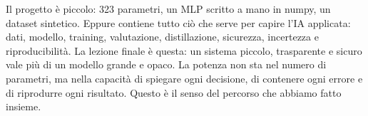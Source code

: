\medskip

Il progetto \progetto{} è piccolo: 323 parametri, un MLP scritto a mano in
numpy, un dataset sintetico. Eppure contiene tutto ciò che serve per capire
l'IA applicata: dati, modello, training, valutazione, distillazione,
sicurezza, incertezza e riproducibilità. La lezione finale è questa: un
sistema piccolo, trasparente e sicuro vale più di un modello grande e
opaco. La potenza non sta nel numero di parametri, ma nella capacità di
spiegare ogni decisione, di contenere ogni errore e di riprodurre ogni
risultato. Questo è il senso del percorso che abbiamo fatto insieme.